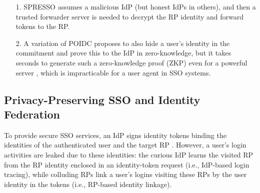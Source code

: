 \begin{table*}[tb]
{\begin{itemize}
\item[1.]
SPRESSO assumes a malicious IdP (but honest IdPs in others), and then a trusted forwarder server is needed to decrypt the RP identity and forward tokens to the RP.

\item[2.]
A variation of POIDC \cite{POIDC} proposes to also hide a user's identity in the commitment and prove this to the IdP in zero-knowledge,
        but it takes seconds to generate such a zero-knowledge proof (ZKP) even for a powerful server \cite{ZKP-BINF,zkp-benchmark,ZKP-GPU},
        which is impracticable for a user agent in SSO systems.
%
\end{itemize}}
\end{table*}

\subsection{Privacy-Preserving SSO and Identity Federation}
\label{subsec-solutions}
To provide secure SSO services,
    an IdP signs identity tokens binding the identities of the authenticated user and the target RP \cite{OpenIDConnect,rfc6749}.
However,
    a user's login activities are leaked due to these identities:
        the curious IdP learns the visited RP from the RP identity enclosed in an identity-token request (i.e., IdP-based login tracing),
        while colluding RPs link a user's logins visiting these RPs by the user identity in the tokens (i.e., RP-based identity linkage).




